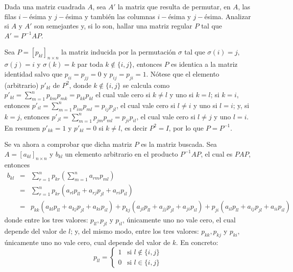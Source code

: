 \begin{enunciado}
 Dada una matriz cuadrada $A$, sea $A'$ la matriz que resulta de permutar, en $A$, las filas $i-$\'esima y $j-$\'esima y tambi\'en las columnas $i-$\'esima y $j-$\'esima. Analizar si $A$ y $A'$ son semejantes y, si lo son, hallar una matriz regular $P$ tal que $A' = P^{-1}AP$.
\end{enunciado}

\begin{solucion}
 Sea $P = [p_{kl}]_{n\times n}$ la matriz inducida por la permutaci\'on $\sigma$ tal que $\sigma(i)=j$, $\sigma(j)=i$ y $\sigma(k)=k$ par toda $k\not\in\{ i,j\}$, entonces $P$ es identica a la matriz identidad salvo que $p_{ii} = p_{jj} = 0$ y $p_{ij} = p_{ji} = 1$. N\'otese que el elemento (arbitrario) $p'_{kl}$ de $P^2$, donde $k\not\in\{i,j\}$ se calcula como $p'_{kl} = \sum_{m=1}^n p_{km}p_{mk} = p_{kk}p_{kl}$ el cual vale cero si $k\neq l$ y uno si $k=l$; si $k = i$, entonces $p'_{il} = \sum_{m=1}^n p_{im}p_{ml} = p_{ij}p_{jl}$, el cual vale cero si $l\neq i$ y uno si $l= i$; y, si $k=j$, entonces $p'_{jl} = \sum_{m=1}^n p_{jm}p_{ml} = p_{ji}p_{il}$, el cual vale cero si $l\neq j$ y uno $l=i$. En resumen $p'_{kk} = 1$ y $p'_{kl} = 0$ si $k\neq l$, es decir $P^2 = I$, por lo que $P = P^{-1}$.
 \par 
 Se va ahora a comprobar que dicha matriz $P$ es la matriz buscada.
 Sea $A=[a_{kl}]_{n\times n}$ y $b_{kl}$ un elemento arbitrario en el producto $P^{-1}AP$, el cual es $PAP$, entonces
 \begin{eqnarray*}
  b_{kl} & = & \sum_{r=1}^n p_{kr}\left( \sum_{m=1}^n a_{rm}p_{ml} \right) \\ 
  & = & \sum_{r=1}^n p_{kr} \left( a_{rl}p_{ll} + a_{rj}p_{jl} + a_{ri}p_{il} \right) \\
  & = & p_{kk}\left( a_{kl}p_{ll} + a_{kj}p_{jl} + a_{ki}p_{il} \right) + p_{kj}\left( a_{jl}p_{ll} + a_{jj}p_{jl} + a_{ji}p_{il} \right) + p_{ji}\left( a_{il}p_{ll} + a_{ij}p_{jl} + a_{ii}p_{il} \right)
 \end{eqnarray*}
 donde entre los tres valores: $p_{ll}, p_{jl}$ y $p_{il}$, \'unicamente uno no vale cero, el cual depende del valor de $l$; y, del mismo modo, entre los tres valores: $p_{kk}, p_{kj}$ y $p_{ki}$, \'unicamente uno no vale cero, cual depende del valor de $k$. En concreto:
 \begin{equation*}
  p_{ll} =
  \left\{
  \begin{matrix}
  1 & \text{si } l\not\in\{ i,j \} \\
  0 & \text{si } l\in \{ i,j \}

\end{matrix}
\end{equation*}
\end{solucion}
